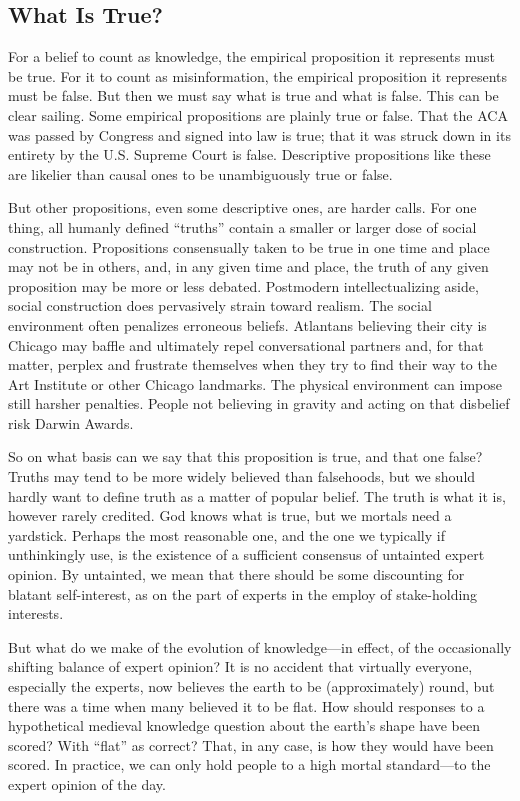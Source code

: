 \documentclass[11pt]{article}
\begin{document}
\subsection{What Is True?}

For a belief to count as knowledge, the empirical proposition it represents must be true. For it to count as misinformation, the empirical proposition it represents must be false. But then we must say what is true and what is false. This can be clear sailing. Some empirical propositions are plainly true or false. That the ACA was passed by Congress and signed into law is true; that it was struck down in its entirety by the U.S. Supreme Court is false. Descriptive propositions like these are likelier than causal ones to be unambiguously true or false.

But other propositions, even some descriptive ones, are harder calls. For one thing, all humanly defined ``truths'' contain a smaller or larger dose of social construction. Propositions consensually taken to be true in one time and place may not be in others, and, in any given time and place, the truth of any given proposition may be more or less debated. Postmodern intellectualizing aside, social construction does pervasively strain toward realism. The social environment often penalizes erroneous beliefs. Atlantans believing their city is Chicago may baffle and ultimately repel conversational partners and, for that matter, perplex and frustrate themselves when they try to find their way to the Art Institute or other Chicago landmarks. The physical environment can impose still harsher penalties. People not believing in gravity and acting on that disbelief risk Darwin Awards.

So on what basis can we say that this proposition is true, and that one false? Truths may tend to be more widely believed than falsehoods, but we should hardly want to define truth as a matter of popular belief. The truth is what it is, however rarely credited. God knows what is true, but we mortals need a yardstick. Perhaps the most reasonable one, and the one we typically if unthinkingly use, is the existence of a sufficient consensus of untainted expert opinion. By untainted, we mean that there should be some discounting for blatant self-interest, as on the part of experts in the employ of stake-holding interests.

But what do we make of the evolution of knowledge---in effect, of the occasionally shifting balance of expert opinion? It is no accident that virtually everyone, especially the experts, now believes the earth to be (approximately) round, but there was a time when many believed it to be flat. How should responses to a hypothetical medieval knowledge question about the earth's shape have been scored? With ``flat'' as correct? That, in any case, is how they would have been scored. In practice, we can only hold people to a high mortal standard---to the expert opinion of the day.
\end{document}
